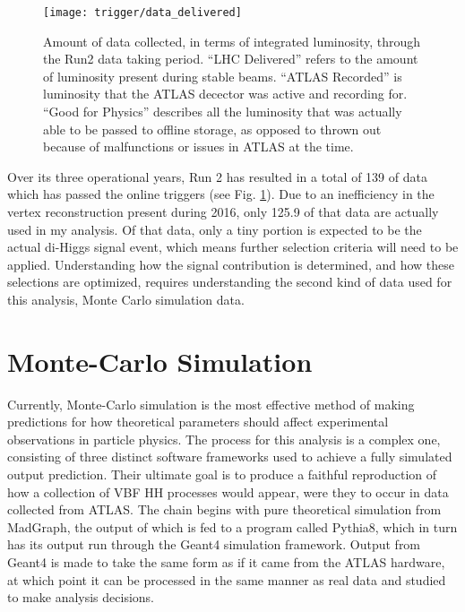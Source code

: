         \begin{figure}[h]
            \texttt{[image: trigger/data\_delivered]}
            \caption{Amount of data collected, in terms of integrated luminosity,
                through the Run2 data taking period\cite{data_quality}.
                ``LHC Delivered'' refers to the amount of luminosity present during stable beams.
                ``ATLAS Recorded'' is luminosity that the ATLAS decector was active and recording for.
                ``Good for Physics'' describes all the luminosity that was actually able to be passed to offline storage,
                    as opposed to thrown out because of malfunctions or issues in ATLAS at the time.
            }
            \label{fig:data_delivered}
        \end{figure}

        Over its three operational years, Run 2 has resulted in a total of 139 \ifb of data which has passed the online triggers
            (see Fig. \ref{fig:data_delivered}).
        Due to an inefficiency in the vertex reconstruction present during 2016,
            only 125.9 \ifb of that data are actually used in my analysis.
        Of that data, only a tiny portion is expected to be the actual di-Higgs signal event,
            which means further selection criteria will need to be applied.
        Understanding how the signal contribution is determined, and how these selections are optimized,
            requires understanding the second kind of data used for this analysis, Monte Carlo simulation data.


\FloatBarrier
\section{Monte-Carlo Simulation} \label{sec:mcsim}
    
    Currently, Monte-Carlo simulation is the most effective method of making predictions
        for how theoretical parameters should affect experimental observations in particle physics.
    The process for this analysis is a complex one, 
        consisting of three distinct software frameworks used to achieve a fully simulated output prediction.
    Their ultimate goal is to produce a faithful reproduction of how a collection of VBF \to HH processes would appear,
        were they to occur in data collected from ATLAS.
    The chain begins with pure theoretical simulation from MadGraph,
        the output of which is fed to a program called Pythia8,
        which in turn has its output run through the Geant4 simulation framework.
    Output from Geant4 is made to take the same form as if it came from the ATLAS hardware,
        at which point it can be processed in the same manner as real data and studied to make analysis decisions.


